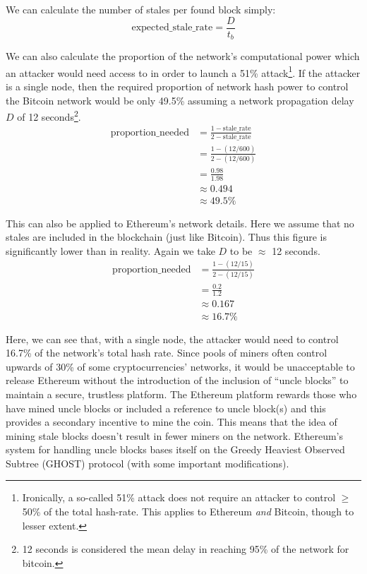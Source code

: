 \documentclass{article}
\begin{document}
We can calculate the number of stales per found block simply:
\[\textrm{expected\_stale\_rate} = \frac{D}{t_b} \]

We can also calculate the proportion of the network's computational power which an attacker would need access to in order to launch a 51\% attack\footnote{Ironically, a so-called 51\% attack does not require an attacker to control $\geq$ 50\% of the total hash-rate. This applies to Ethereum \textit{and} Bitcoin, though to lesser extent.}. If the attacker is a single node, then the required proportion of network hash power to control the Bitcoin network would be only 49.5\% assuming a network propagation delay $D$ of 12 seconds\footnote{12 seconds\cite{twelve_s_for_btc} is considered the mean delay in reaching 95\% of the network for bitcoin.}.
\begin{align*}
    \textrm{proportion\_needed} &= \frac{1-\textrm{stale\_rate}} {2-\textrm{stale\_rate}} \\
    &= \frac{1 - (12 / 600)} {2 - (12 / 600)} \\
    &= \frac{0.98}{1.98} \\
    &\approx 0.494 \\
    &\approx 49.5\%
\end{align*}

This can also be applied to Ethereum's network details. Here we assume that no stales are included in the blockchain (just like Bitcoin). Thus this figure is significantly lower than in reality. Again we take $D$ to be $\approx$ 12 seconds.
\begin{align*}
    \textrm{proportion\_needed} &= \frac{1 - (12 / 15)} {2 - (12 / 15)} \\
    &= \frac{0.2}{1.2} \\
    &\approx 0.167 \\
    &\approx 16.7\%
\end{align*}

Here, we can see that, with a single node, the attacker would need to control 16.7\% of the network's total hash rate. Since pools of miners often control upwards of 30\% of some cryptocurrencies' networks, it would be unacceptable to release Ethereum without the introduction of the inclusion of ``uncle blocks'' to maintain a secure, trustless platform. The Ethereum platform rewards those who have mined uncle blocks or included a reference to uncle block(s) and this provides a secondary incentive to mine the coin. This means that the idea of mining stale blocks doesn't result in fewer miners on the network. Ethereum's system for handling uncle blocks bases itself on the Greedy Heaviest Observed Subtree (GHOST) protocol (with some important modifications).
\end{document}
